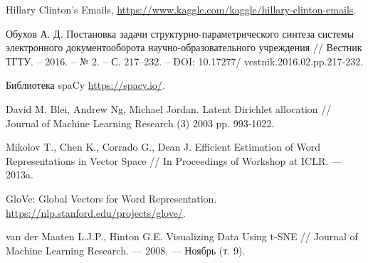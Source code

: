 \documentclass[a4paper,14pt]{extreport}
\author{Гулина Кирилла Ивановича}
\begin{document}
  \maketitle

  \setcounter{page}{2}

  {
    \renewcommand{\contentsname}{Содержание}
    \tableofcontents
  } 
  
  

  

  
  
  
  
  

\begin{thebibliography}{3}

Hillary Clinton's Emails,
\url{https://www.kaggle.com/kaggle/hillary-clinton-emails}.

Обухов А. Д. Постановка задачи структурно-параметрического синтеза системы
электронного документооборота научно-образовательного учреждения // Вестник ТГТУ. –
2016. – № 2. – С. 217–232. – DOI: 10.17277/
vestnik.2016.02.pp.217-232.

Библиотека spaCy \url{https://spacy.io/}.

David M. Blei, Andrew Ng, Michael Jordan. Latent Dirichlet allocation // Journal of Machine Learning Research (3) 2003 pp. 993-1022.

Mikolov T., Chen K., Corrado G., Dean J. Efficient Estimation of Word Representations in Vector Space // In Proceedings of Workshop at ICLR. — 2013a.

GloVe: Global Vectors for Word Representation. \url{https://nlp.stanford.edu/projects/glove/}.

van der Maaten L.J.P., Hinton G.E. Visualizing Data Using t-SNE // Journal of Machine Learning Research. — 2008. — Ноябрь (т. 9).

\end{thebibliography}





  

\end{document}
